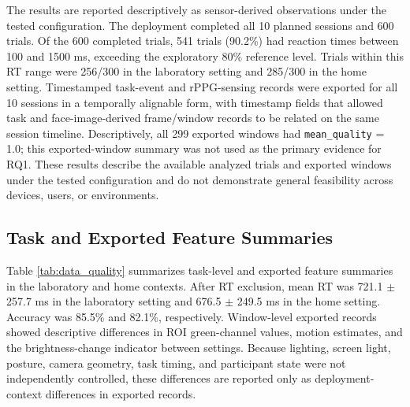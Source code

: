 \documentclass[dvipdfmx]{ehis}
\begin{document}
The results are reported descriptively as sensor-derived observations under the tested configuration.
The deployment completed all 10 planned sessions and 600 trials.
Of the 600 completed trials, 541 trials (90.2\%) had reaction times between 100 and 1500 ms, exceeding the exploratory 80\% reference level.
Trials within this RT range were 256/300 in the laboratory setting and 285/300 in the home setting.
Timestamped task-event and rPPG-sensing records were exported for all 10 sessions in a temporally alignable form, with timestamp fields that allowed task and face-image-derived frame/window records to be related on the same session timeline.
Descriptively, all 299 exported windows had \texttt{mean\_quality} = 1.0; this exported-window summary was not used as the primary evidence for RQ1.
These results describe the available analyzed trials and exported windows under the tested configuration and do not demonstrate general feasibility across devices, users, or environments.

\subsection{Task and Exported Feature Summaries}
Table \ref{tab:data_quality} summarizes task-level and exported feature summaries in the laboratory and home contexts.
After RT exclusion, mean RT was 721.1 $\pm$ 257.7 ms in the laboratory setting and 676.5 $\pm$ 249.5 ms in the home setting.
Accuracy was 85.5\% and 82.1\%, respectively.
Window-level exported records showed descriptive differences in ROI green-channel values, motion estimates, and the brightness-change indicator between settings.
Because lighting, screen light, posture, camera geometry, task timing, and participant state were not independently controlled, these differences are reported only as deployment-context differences in exported records.
\end{document}
